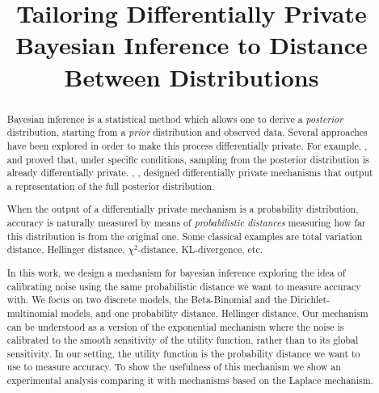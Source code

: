 \documentclass{article}
\begin{document}
\title{Tailoring Differentially Private Bayesian Inference to Distance Between Distributions}



\begin{abstract} Bayesian inference is a statistical method which
allows one to derive a \emph{posterior} distribution,
starting from a \emph{prior} distribution and observed data. Several
approaches have been explored in order to make this process differentially
private. For example, \cite{dimitrakakis2014robust}, and
\cite{wang2015privacy} proved that, under specific conditions, sampling from
the posterior distribution is already differentially private. \cite{zhang2016differential}, \cite{foulds2016theory},
designed differentially private mechanisms that output a
representation of the full posterior distribution. 

When the output of a differentially private mechanism is a probability
distribution, accuracy is naturally measured by means of
\emph{probabilistic distances} measuring how far this distribution is
from the original one. Some classical examples are total variation distance,
Hellinger distance, $\chi^2$-distance, KL-divergence, etc.

In this work, we design a mechanism for
bayesian inference exploring the idea of calibrating noise using the
same probabilistic distance we want to measure accuracy with. 
We focus on two discrete models, the Beta-Binomial and the
Dirichlet-multinomial models, and one probability distance, Hellinger distance. 
Our mechanism can be understood as a version of  the exponential mechanism
where the noise is calibrated to the smooth sensitivity of the
utility function, rather than to its global sensitivity. In our
setting, the utility function is the probability distance we want to
use to measure accuracy. To show the usefulness of this mechanism we
show an experimental analysis comparing it with mechanisms based on
the Laplace mechanism.
\end{abstract}

\maketitle
\end{document}
